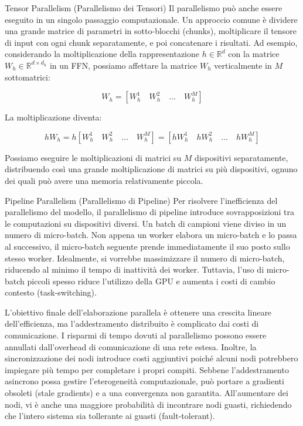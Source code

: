 \begin{definition}{Tensor Parallelism (Parallelismo dei Tensori)}
Il parallelismo può anche essere eseguito in un singolo passaggio computazionale. Un approccio comune è dividere una grande matrice di parametri in sotto-blocchi (chunks), moltiplicare il tensore di input con ogni chunk separatamente, e poi concatenare i risultati. Ad esempio, considerando la moltiplicazione della rappresentazione $h \in \mathbb{R}^d$ con la matrice $W_h \in \mathbb{R}^{d \times d_h}$ in un FFN, possiamo affettare la matrice $W_h$ verticalmente in $M$ sottomatrici:


$$W_h = [W_h^1 \quad W_h^2 \quad \dots \quad W_h^M]$$


La moltiplicazione diventa:


$$hW_h = h [W_h^1 \quad W_h^2 \quad \dots \quad W_h^M] = [hW_h^1 \quad hW_h^2 \quad \dots \quad hW_h^M]$$


Possiamo eseguire le moltiplicazioni di matrici su $M$ dispositivi separatamente, distribuendo così una grande moltiplicazione di matrici su più dispositivi, ognuno dei quali può avere una memoria relativamente piccola.
\end{definition}

\begin{definition}{Pipeline Parallelism (Parallelismo di Pipeline)}
Per risolvere l'inefficienza del parallelismo del modello, il parallelismo di pipeline introduce sovrapposizioni tra le computazioni su dispositivi diversi. Un batch di campioni viene diviso in un numero di micro-batch. Non appena un worker elabora un micro-batch e lo passa al successivo, il micro-batch seguente prende immediatamente il suo posto sullo stesso worker. Idealmente, si vorrebbe massimizzare il numero di micro-batch, riducendo al minimo il tempo di inattività dei worker. Tuttavia, l'uso di micro-batch piccoli spesso riduce l'utilizzo della GPU e aumenta i costi di cambio contesto (task-switching).
\end{definition}

\begin{observation}
L'obiettivo finale dell'elaborazione parallela è ottenere una crescita lineare dell'efficienza, ma l'addestramento distribuito è complicato dai costi di comunicazione. I risparmi di tempo dovuti al parallelismo possono essere annullati dall'overhead di comunicazione di una rete estesa. Inoltre, la sincronizzazione dei nodi introduce costi aggiuntivi poiché alcuni nodi potrebbero impiegare più tempo per completare i propri compiti. Sebbene l'addestramento asincrono possa gestire l'eterogeneità computazionale, può portare a gradienti obsoleti (stale gradients) e a una convergenza non garantita. All'aumentare dei nodi, vi è anche una maggiore probabilità di incontrare nodi guasti, richiedendo che l'intero sistema sia tollerante ai guasti (fault-tolerant).
\end{observation}

